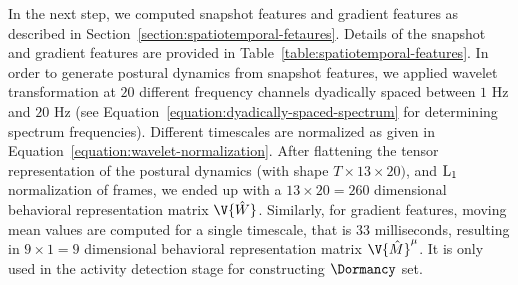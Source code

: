 In the next step, we computed snapshot features and gradient features as described in Section~\ref{section:spatiotemporal-fetaures}.
Details of the snapshot and gradient features are provided in Table~\ref{table:spatiotemporal-features}.
In order to generate postural dynamics from snapshot features, we applied wavelet transformation at $20$ different frequency channels dyadically spaced between $1$ Hz and $20$ Hz (see Equation~\ref{equation:dyadically-spaced-spectrum} for determining spectrum frequencies).
Different timescales are normalized as given in Equation~\ref{equation:wavelet-normalization}.
After flattening the tensor representation of the postural dynamics (with shape $T \times 13 \times 20)$, and $\textnormal{L}_1$ normalization of frames, we ended up with a $13 \times 20 = 260$ dimensional behavioral representation matrix $\V{\hat{W}}$.
Similarly, for gradient features, moving mean values are computed for a single timescale, that is $33$ milliseconds, resulting in $9 \times 1 = 9$ dimensional behavioral representation matrix $\V{\hat{M}}^\mu$.
It is only used in the activity detection stage for constructing $\Dormancy$ set.

